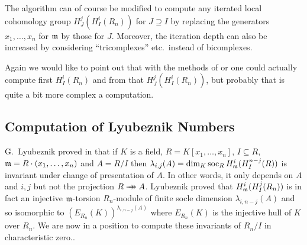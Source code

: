 The algorithm can of course be modified to compute any iterated local
cohomology group $H^j_J(H^i_I(R_n))$ for $J\supseteq I$ by replacing
the generators $x_1,\ldots,x_n$ for ${\mathfrak m}$ by those for $J$. Moreover,
the iteration depth can also be increased by considering
``tricomplexes'' etc.\ instead of bicomplexes.

Again we would like to point out that with the methods of \cite{DM:O-T1}
or \cite{DM:O-T-W} one could actually compute first $H^i_I(R_n)$ and from
that $H^j_J(H^i_I(R_n))$, but probably that is quite a bit more
complex a computation. 
%
\subsection{Computation of Lyubeznik Numbers}
G.\ Lyubeznik proved in \cite{DM:L-Dmod} that if $K$ is a field, 
$R=K[x_1,\ldots,x_n]$, 
$I\subseteq R$, ${\mathfrak m}=R\cdot (x_1,\ldots,x_n)$ 
and $A=R/I$ then $\lambda_{i,j}(A)=\dim_K\operatorname{soc}_R H^i_{\mathfrak m}(H^{n-j}_I(R))$ is
invariant under change of presentation of $A$. 
In other words, it only
depends on $A$ and $i,j$ but not the projection $R\to\hskip-1.7ex\to A$. 
Lyubeznik proved that $H^i_{\mathfrak m} (H^j_I(R_n))$ is in fact an injective
${\mathfrak m}$-torsion $R_n$-module of finite socle dimension $\lambda_{i,n-j}(A)$
and so
isomorphic to $(E_{R_n}(K))^{\lambda_{i,n-j}(A)}$ where $E_{R_n}(K)$ is the
injective hull of $K$ over $R_n$. We
are now in a position to compute these invariants of $R_n/I$ in
characteristic zero..

